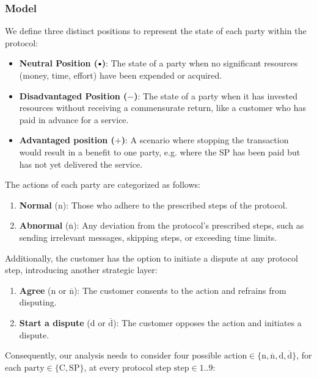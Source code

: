 \documentclass[pdftex,twocolumn,epjc3]{svjour3}
\newcommand{\normal}{\mathrm{n}}
\newcommand{\dispute}{\mathrm{d}}
\newcommand{\abnormal}{\overline{\mathrm{n}}}
\newcommand{\abdispute}{\overline{\mathrm{d}}}
\newcommand{\plus}{+}
\newcommand{\minus}{-}
\newcommand\neutral[1][.75]{\mathbin{\ThisStyle{\vcenter{\hbox{%
  \scalebox{#1}{$\SavedStyle\bullet$}}}}}%
}
\begin{document}
\subsubsection{Model}\label{sec:fairness-model}
We define three distinct positions to represent the state of each party within the protocol:


\begin{itemize}
\item \textbf{Neutral Position ($\neutral{}$)}: The state of a party when no significant resources (money, time, effort) have been expended or acquired.
\item \textbf{Disadvantaged Position ($\minus{}$)}: The state of a party when it has invested resources without receiving a commensurate return, like a customer who has paid in advance for a service.
\item \textbf{Advantaged position ($\plus{}$)}: A scenario where stopping the transaction would result in a benefit to one party, e.g. where the SP has been paid but has not yet delivered the service.
\end{itemize}

The actions of each party are categorized as follows:

\begin{enumerate}
\item \textbf{Normal} ($\normal{}$): Those who adhere to the prescribed steps of the protocol.
\item \textbf{Abnormal} ($\abnormal{}$): Any deviation from the protocol's prescribed steps, such as sending irrelevant messages, skipping steps, or exceeding time limits.
\end{enumerate}

Additionally, the customer has the option to initiate a dispute at any protocol step, introducing another strategic layer:

\begin{enumerate}
\def\labelenumi{\arabic{enumi}.}
\item \textbf{Agree} ($\normal{}$ or $\abnormal{}$): The customer consents to the action and refrains from disputing.
\item \textbf{Start a dispute} ($\dispute{}$ or $\abdispute{}$): The customer opposes the action and initiates a dispute.
\end{enumerate}

\begin{sloppypar}
Consequently, our analysis needs to consider four possible $\mathrm{action} \in \{ \normal{}, \abnormal{}, \dispute{}, \abdispute{} \}$, for each $\mathrm{party \in \{C, SP\} }$, at every protocol step $\mathrm{step \in 1..9}$:
\end{sloppypar}
\end{document}
